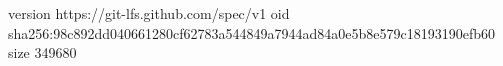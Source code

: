version https://git-lfs.github.com/spec/v1
oid sha256:98c892dd040661280cf62783a544849a7944ad84a0e5b8e579c18193190efb60
size 349680
